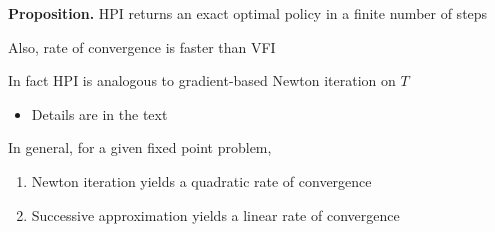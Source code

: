 \documentclass[xcolor=dvipsnames]{beamer}
\newcommand{\1}{\mathbbm 1}
\begin{document}
\begin{frame}
    
    \begin{block}{}
        {\bf Proposition.} 
            HPI returns an exact optimal policy in a finite number of steps
    \end{block}

    \vspace{0.5em}
    \vspace{0.5em}
    \vspace{0.5em}

    Also, rate of convergence is faster than VFI 

    \vspace{0.5em}
    \vspace{0.5em}

    In fact HPI is analogous to gradient-based Newton iteration on $T$
    \vspace{0.5em}

    \begin{itemize}
        \item Details are in the text
    \end{itemize}

    In general, for a given fixed point problem,
    \begin{enumerate}
        \item Newton iteration yields a quadratic rate of convergence
        \vspace{0.5em}
        \item Successive approximation yields a linear rate of convergence
    \end{enumerate}

\end{frame}
\end{document}
